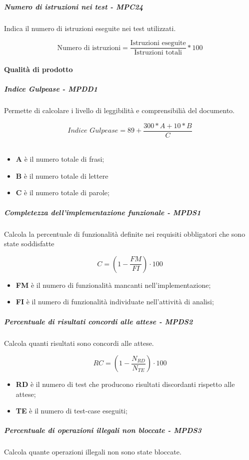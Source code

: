 \subparagraph{Numero di istruzioni nei test - MPC24}
Indica il numero di istruzioni eseguite nei test utilizzati.

\begin{equation*}
\text{Numero di istruzioni} = \frac{\text{Istruzioni eseguite}}{\text{Istruzioni totali}} * 100
\end{equation*}


\paragraph{Qualità di prodotto}
\subparagraph{Indice Gulpease - MPDD1}
Permette di calcolare i livello di leggibilità e comprensibilià del documento.

\begin{equation*}\textit{Indice Gulpease} = 89 + \frac{300 * \textit{A} + 10 * B}{C}\end{equation*} \\
\begin{itemize}
	\item \textbf{A} è il numero totale di frasi;
	\item \textbf{B} è il numero totale di lettere
	\item \textbf{C} è il numero totale di parole;
\end{itemize}
\subparagraph{Completezza dell’implementazione funzionale - MPDS1}
Calcola la percentuale di funzionalità definite nei requisiti obbligatori che sono state soddisfatte

\begin{equation*}
C=(1-\frac{FM}{FI})\cdot 100
\end{equation*}
\begin{itemize}
	\item \textbf{FM} è il numero di funzionalità mancanti nell'implementazione;
	\item \textbf{FI} è il numero di funzionalità individuate nell'attività di analisi;
\end{itemize}
\subparagraph{Percentuale di risultati concordi alle attese - MPDS2}
Calcola quanti risultati sono concordi alle attese.

\begin{equation*} RC = (1-\frac{N_{RD}}{N_{TE}}) \cdot 100 \end{equation*}
\begin{itemize}
	\item \textbf{RD} è il numero di test che producono risultati discordanti rispetto alle attese;
	\item \textbf{TE}  è il numero di test-case eseguiti;
\end{itemize}
\subparagraph{Percentuale di operazioni illegali non bloccate - MPDS3}
Calcola quante operazioni illegali non sono state bloccate.

